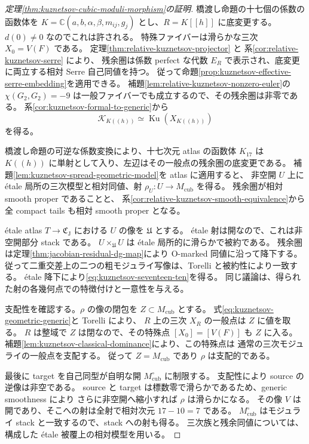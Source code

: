 \begin{proof}[定理\ref{thm:kuznetsov-cubic-moduli-morphism}の証明]
橋渡し命題の十七個の係数の函数体を
$K=\mathbb C(a,b,\alpha,\beta,m_{ij},g_j)$ とし、$R=K[[h]]$ に底変更する。
$d(0)\ne0$ なのでこれは許される。
特殊ファイバーは滑らかな三次 $X_0=V(F)$ である。
定理\ref{thm:relative-kuznetsov-projector} と
系\ref{cor:relative-kuznetsov-serre} により、
残余圏は係数 perfect な代数 $E_R$ で表示され、底変更に両立する相対 Serre 自己同値を持つ。
従って命題\ref{prop:kuznetsov-effective-serre-embedding}を適用できる。
補題\ref{lem:relative-kuznetsov-nonzero-euler}の
$\chi(G_2,G_2)=-9$ は一般ファイバーでも成立するので、その残余圏は非零である。
系\ref{cor:kuznetsov-formal-to-generic}から
\begin{equation}\label{eq:kuznetsov-geometric-generic}
 \mathcal K_{K((h))}\simeq\operatorname{Ku}(X_{K((h))})
\end{equation}
を得る。

橋渡し命題の可逆な係数変換により、十七次元 atlas の函数体
$K_{17}$ は $K((h))$ に単射として入り、左辺はその一般点の残余圏の底変更である。
補題\ref{lem:kuznetsov-spread-geometric-model}を atlas に適用すると、
非空開 $U$ 上に étale 局所の三次模型と相対同値、射
$\rho_U:U\to M_{\mathrm{cub}}$ を得る。
残余圏が相対 smooth proper であることと、
系\ref{cor:relative-kuznetsov-smooth-equivalence}から全 compact tails も相対 smooth proper となる。

étale atlas $T\to\mathfrak C_{\mathrm J}$ における $U$ の像を $\mathfrak U$ とする。
étale 射は開なので、これは非空開部分 stack である。
$U\times_{\mathfrak U}U$ は étale 局所的に滑らかで被約である。
残余圏は定理\ref{thm:jacobian-residual-dg-map}により O-marked 同値に沿って降下する。
従って二重交差上の二つの粗モジュライ写像は、Torelli と被約性により一致する。
étale 降下により\eqref{eq:kuznetsov-seventeen-ten}を得る。
同じ議論は、得られた射の各幾何点での特徴付けと一意性を与える。

支配性を確認する。$\rho$ の像の閉包を $Z\subset M_{\mathrm{cub}}$ とする。
式\eqref{eq:kuznetsov-geometric-generic}と Torelli により、
$R$ 上の三次 $X_R$ の一般点は $Z$ に値を取る。
$R$ は整域で $Z$ は閉なので、その特殊点 $[X_0]=[V(F)]$ も $Z$ に入る。
補題\ref{lem:kuznetsov-classical-dominance}により、この特殊点は
通常の三次モジュライの一般点を支配する。
従って $Z=M_{\mathrm{cub}}$ であり $\rho$ は支配的である。

最後に target を自己同型が自明な開 $M_{\mathrm{cub}}^\circ$ に制限する。
支配性により source の逆像は非空である。
source と target は標数零で滑らかであるため、generic smoothness により
さらに非空開へ縮小すれば $\rho$ は滑らかになる。
その像 $V$ は開であり、そこへの射は全射で相対次元 $17-10=7$ である。
$M_{\mathrm{cub}}^\circ$ はモジュライ stack と一致するので、stack への射も得る。
三次族と残余同値については、構成した étale 被覆上の相対模型を用いる。
\end{proof}

